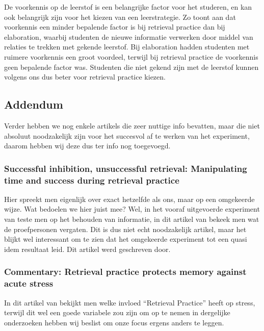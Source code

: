 \documentclass[12pt,a4paper]{article}
\begin{document}
            De voorkennis op de leerstof is een belangrijke factor voor het studeren, en kan ook 
            belangrijk zijn voor het kiezen van een leerstrategie. Zo toont \cite{Xiaofeng2016} aan dat voorkennis een minder bepalende factor is bij retrieval practice dan bij elaboration, waarbij studenten de nieuwe informatie verwerken door middel van relaties te trekken met gekende leerstof.
            Bij elaboration hadden studenten met ruimere voorkennis een groot voordeel, terwijl bij retrieval
            practice de voorkennis geen bepalende factor was.
            Studenten die niet gekend zijn met de leerstof kunnen volgens ons dus beter voor retrieval 
            practice kiezen.
            
        \subsection{Addendum}
        
        Verder hebben we nog enkele artikels die zeer nuttige info bevatten, maar die niet absoluut noodzakelijk zijn voor het succesvol af te werken van het experiment, daarom hebben wij deze dus ter info nog toegevoegd.
        
        \subsubsection{Successful inhibition, unsuccessful retrieval: Manipulating time and success during retrieval practice}
        
        Hier spreekt men eigenlijk over exact hetzelfde als ons, maar op een omgekeerde wijze. Wat bedoelen we hier juist mee? Wel, in het vooraf uitgevoerde experiment van \cite{HenryRoediger2006} teste men op het behouden van informatie, in dit artikel van \cite{BenjaminStorm2009} bekeek men wat de proefpersonen vergaten. Dit is dus niet echt noodzakelijk artikel, maar het blijkt wel interessant om te zien dat het omgekeerde experiment tot een quasi idem resultaat leid. Dit artikel werd geschreven door. 
        
        \subsubsection{Commentary: Retrieval practice protects memory against acute stress}
        
        In dit artikel van \cite{Smith2016} bekijkt men welke invloed ``Retrieval Practice'' heeft op stress, terwijl dit wel een goede variabele zou zijn om op te nemen in dergelijke onderzoeken hebben wij beslist om onze focus ergens anders te leggen.
        
\end{document}
